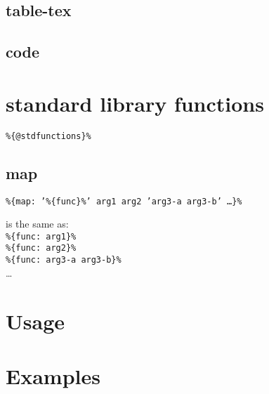 \documentclass{memoir}
\newcommand{\var}[1]{\texttt{\%\{#1\}\%}}
\begin{document}
	\section{table-tex}
	\section{code}


\chapter{standard library functions} %
\var{@stdfunctions}
\section{map}
\var{map: '\var{func}' arg1 arg2 'arg3-a arg3-b' \ldots}

is the same as:\\
\var{func: arg1}\\
\var{func: arg2}\\
\var{func: arg3-a arg3-b}\\
\ldots


\chapter{Usage}
\chapter{Examples}

\printglossary
\end{document}
